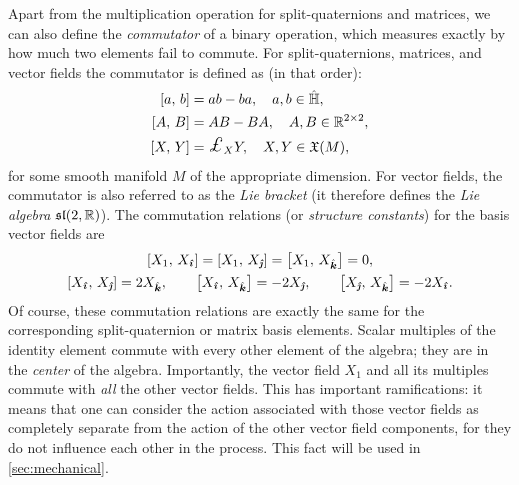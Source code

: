 Apart from the multiplication operation for split-quaternions and matrices, we can also define the \emph{commutator} of a binary operation, which measures exactly by how much two elements fail to commute. For split-quaternions, matrices, and vector fields the commutator is defined as (in that order): 
\begin{equation}
    \begin{split}
        \liebr{a}{b} &= ab - ba,\quad a, b \in \spquaternions, \\
        \liebr{A}{B} &= AB - BA,\quad A, B \in \real^{2\times 2}, \\
        \liebr{X}{Y} &= \lied{X}{Y},\quad X,Y\in \vfields{M},
    \end{split}
\end{equation}
for some smooth manifold \(M\) of the appropriate dimension. For vector fields, the commutator is also referred to as the \emph{Lie bracket} (it therefore defines the \emph{Lie algebra} \(\mathfrak{sl}(2, \mathbb{R})\)). The commutation relations (or \emph{structure constants}) for the basis vector fields are \cite{Schuller2014}
\begin{gather}
    \liebr{X_1}{X_{\quati}} = \liebr{X_1}{X_{\quatj}} = \liebr{X_1}{X_{\quatk}} = 0, \\
    \liebr{X_{\quati}}{X_{\quatj}} = 2X_{\quatk}, \qquad  
    \liebr{X_{\quati}}{X_{\quatk}} = -2X_{\quatj}, \qquad
    \liebr{X_{\quatj}}{X_{\quatk}} = -2X_{\quati}.
\end{gather}
Of course, these commutation relations are exactly the same for the corresponding split-quaternion or matrix basis elements. Scalar multiples of the identity element commute with every other element of the algebra; they are in the \emph{center} of the algebra. Importantly, the vector field \(X_1\) and all its multiples commute with 
\emph{all} the other vector fields. This has important ramifications: it means that one can consider the action associated with those vector fields as completely separate from the action of the other vector field components, for they do not influence each other in the process. This fact will be used in \cref{sec:mechanical}.

